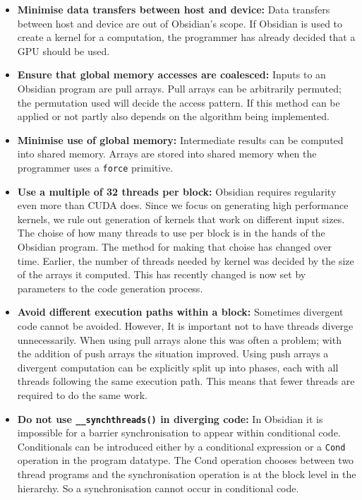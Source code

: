 \documentclass[a4paper]{book}
\begin{document}
\begin{itemize} 

\item {\bf Minimise data transfers between host and device:} Data transfers
between host and device are out of Obsidian's scope. If Obsidian is used to create 
a kernel for a computation, the programmer has already decided that a GPU should be used. 

\item {\bf Ensure that global memory accesses are coalesced:} Inputs to an Obsidian 
program are pull arrays. Pull arrays can be arbitrarily permuted; the permutation 
used will decide the access pattern. If this method can be applied or not partly also 
depends on the algorithm being implemented. 

\item {\bf Minimise use of global memory:} Intermediate results can be computed into 
shared memory. Arrays are stored into shared memory when the programmer uses a 
{\tt force} primitive.   

\item {\bf Use a multiple of 32 threads per block:} Obsidian requires regularity even more 
than CUDA does. Since we focus on generating high performance kernels, we rule out generation 
of kernels that work on different input sizes. The choise of how many threads to use per block 
is in the hands of the Obsidian program. The method for making that choise has changed over time. 
Earlier, the number of threads needed by kernel was decided by the size of the arrays it 
computed. This has recently changed is now set by parameters to the code generation process. 

\item {\bf Avoid different execution paths within a block:} Sometimes divergent code cannot 
be avoided. However, It is important not to have threads diverge unnecessarily. When using pull 
arrays alone this was often a problem; with the addition of push arrays the situation improved. 
Using push arrays a divergent computation can be explicitly split up into phases, each with all 
threads following the same execution path. This means that fewer threads are required to do the 
same work. 

\item {\bf Do not use {\tt \_\_synchthreads()} in diverging code:} In Obsidian it is impossible 
for a barrier synchronisation to appear within conditional code. Conditionals can be introduced 
either by a conditional expression or a {\tt Cond} operation in the program datatype. The Cond 
operation chooses between two thread programs and the synchronisation operation is at the block 
level in the hierarchy. So a synchronisation cannot occur in conditional code. 
\end{itemize} 
\end{document}
